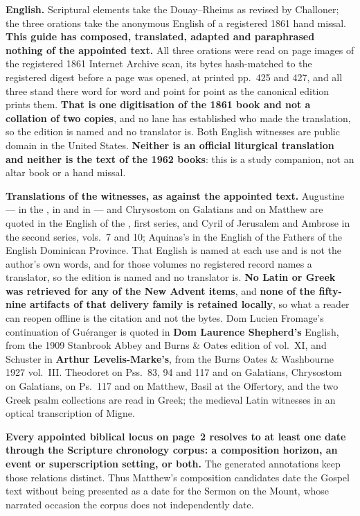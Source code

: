 \textbf{English.} Scriptural elements take the Douay--Rheims as revised by
Challoner; the three orations take the anonymous English of a registered 1861
hand missal. \textbf{This guide has composed, translated, adapted and
paraphrased nothing of the appointed text.} All three orations were read on page
images of the registered 1861 Internet Archive scan, its bytes hash-matched to
the registered digest before a page was opened, at printed pp.~425 and 427, and
all three stand there word for word and point for point as the canonical
edition prints them. \textbf{That is one digitisation of the 1861 book and not a collation of
two copies}, and no lane has established who made the translation, so the
edition is named and no translator is. Both English witnesses are public domain
in the United States. \textbf{Neither is an official liturgical translation and
neither is the text of the 1962 books}: this is a study companion, not an altar
book or a hand missal.

\textbf{Translations of the witnesses, as against the appointed text.} Augustine
--- in the , in  and in
 --- and Chrysostom on Galatians and on Matthew are
quoted in the English of the , first
series, and Cyril of Jerusalem and Ambrose in the second series, vols.~7 and 10;
Aquinas's  in the English of the Fathers of the English
Dominican Province. That English is named at each use and is not the author's
own words, and for those volumes no registered record names a translator, so the
edition is named and no translator is. \textbf{No Latin or Greek was retrieved
for any of the New Advent items}, and \textbf{none of the fifty-nine artifacts
of that delivery family is retained locally}, so what a reader can reopen offline
is the citation and not the bytes. Dom Lucien Fromage's continuation of
Guéranger is quoted in \textbf{Dom Laurence Shepherd's} English, from the 1909
Stanbrook Abbey and Burns \& Oates edition of 
vol.~XI, and Schuster in \textbf{Arthur Levelis-Marke's}, from the Burns Oates
\& Washbourne 1927  vol.~III. Theodoret on Pss.~83, 94
and 117 and on Galatians, Chrysostom on Galatians, on Ps.~117 and on Matthew,
Basil at the Offertory, and the two Greek psalm collections are read in Greek;
the medieval Latin witnesses in an optical transcription of Migne.

\textbf{Every appointed biblical locus on page~2 resolves to at least one date
through the Scripture chronology corpus: a composition horizon, an event or
superscription setting, or both.} The generated annotations keep those
relations distinct. Thus Matthew's composition candidates date the Gospel
text without being presented as a date for the Sermon on the Mount, whose
narrated occasion the corpus does not independently date.

